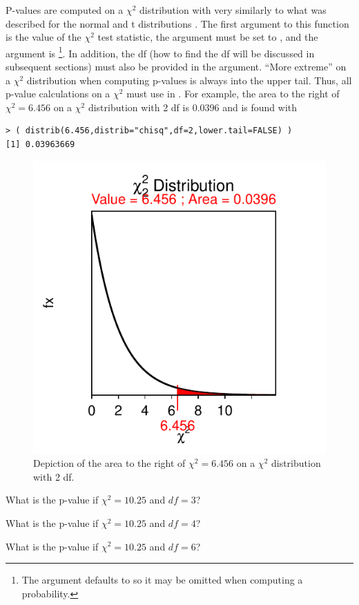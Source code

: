 \documentclass[10pt,openany]{book}\usepackage[]{graphicx}\usepackage[]{color}
\makeatletter
\newenvironment{kframe}{%
 \def\at@end@of@kframe{}%
 \ifinner\ifhmode%
  \def\at@end@of@kframe{\end{minipage}}%
  \begin{minipage}{\columnwidth}%
 \fi\fi%
 \def\FrameCommand##1{\hskip\@totalleftmargin \hskip-\fboxsep
 \colorbox{shadecolor}{##1}\hskip-\fboxsep
     \hskip-\linewidth \hskip-\@totalleftmargin \hskip\columnwidth}%
 \MakeFramed {\advance\hsize-\width
   \@totalleftmargin\z@ \linewidth\hsize
   \@setminipage}}%
 {\par\unskip\endMakeFramed%
 \at@end@of@kframe}
\newenvironment{knitrout}{}{} %
\makeatother
\begin{document}
P-values are computed on a $\chi^2$ distribution with  very similarly to what was described for the normal  and t distributions .  The first argument to this function is the value of the $\chi^2$ test statistic, the  argument must be set to , and the  argument is \footnote{The  argument defaults to  so it may be omitted when computing a probability.}.  In addition, the df (how to find the df will be discussed in subsequent sections) must also be provided in the  argument.  ``More extreme'' on a $\chi^2$ distribution when computing p-values is always into the upper tail.  Thus, all p-value calculations on a $\chi^2$ must use  in .  For example, the area to the right of $\chi^2=6.456$ on a $\chi^2$ distribution with 2 df is 0.0396  and is found with

\begin{knitrout}
\color{fgcolor}\begin{kframe}
\begin{verbatim}
> ( distrib(6.456,distrib="chisq",df=2,lower.tail=FALSE) )
[1] 0.03963669
\end{verbatim}
\end{kframe}\begin{figure}[hbtp]

{\centering \includegraphics[width=.4\linewidth]{Figs/chiarea1-1} 

}

\caption[Depiction of the area to the right of $\chi^2=6.456$ on a $\chi^2$ distribution with 2 df]{Depiction of the area to the right of $\chi^2=6.456$ on a $\chi^2$ distribution with 2 df.}\label{fig:chiarea1}
\end{figure}


\end{knitrout}

\vspace{-12pt}
\begin{exsection}
\vspace{-3pt}
  \item \label{revex:ChiPVal1} What is the p-value if $\chi^{2}=10.25$ and $df=3$? 
  \item \label{revex:ChiPVal2} What is the p-value if $\chi^{2}=10.25$ and $df=4$? 
  \item \label{revex:ChiPVal3} What is the p-value if $\chi^{2}=10.25$ and $df=6$? 
\end{exsection}
\end{document}
